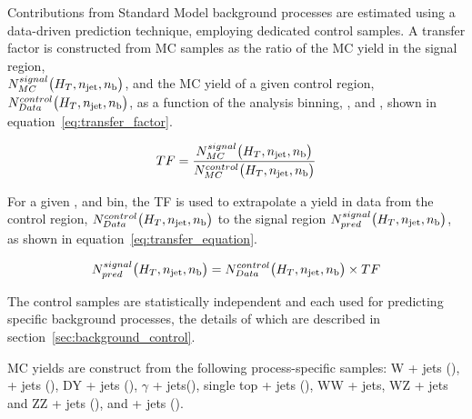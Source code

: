 Contributions from Standard Model background processes are estimated using a data-driven 
prediction technique, employing dedicated control samples. A transfer factor 
is constructed from MC samples as the ratio 
of the MC yield in the signal region, \\$N_{MC}^{signal}\big(H_T, n_{\text{jet}}, n_{\text{b}}\big)$,
and the MC yield of a given control region, \\$N_{Data}^{control}\big(H_T, n_{\text{jet}}, n_{\text{b}}\big)$,
as a function of the analysis binning, \HT, \nj and \nb, shown in
equation~\ref{eq:transfer_factor}.

\begin{equation}
TF = \frac{N_{MC}^{signal}\big(H_T, n_{\text{jet}}, n_{\text{b}}\big)}{N_{MC}^{control}\big(H_T, n_{\text{jet}}, n_{\text{b}}\big)}
\label{eq:transfer_factor}
\end{equation}

For a given \HT, \nj and \nb bin, the TF is used to extrapolate a yield in data from
the control region, $N_{Data}^{control}\big(H_T, n_{\text{jet}}, n_{\text{b}}\big)$
to the signal region $N_{pred}^{signal}\big(H_T, n_{\text{jet}}, n_{\text{b}}\big)$, as shown in
equation~\ref{eq:transfer_equation}.

\begin{equation}
N_{pred}^{signal}\big(H_T, n_{\text{jet}}, n_{\text{b}}\big) = N_{Data}^{control}\big(H_T, n_{\text{jet}}, n_{\text{b}}\big)
\times TF
\label{eq:transfer_equation}
\end{equation}

The control samples are statistically independent and each used for predicting 
specific background processes, the details of which are described in
section~\ref{sec:background_control}.

MC yields are construct from the following process-specific samples:
W + jets (\numw),
\ttbar + jets (\numtt), DY + jets (\numdy), $\gamma$ + jets(\numgam),
single top + jets (\numtop), WW + jets, WZ + jets and ZZ + jets (\numdibo), and
\zinv + jets (\numzinv).


